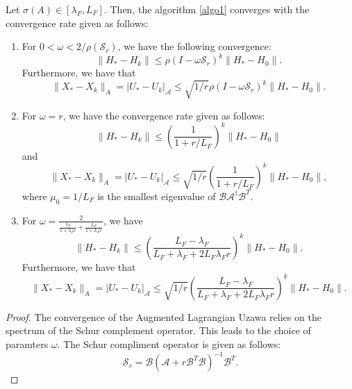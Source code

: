 \begin{itemize}
\begin{theorem}
Let $\sigma(A) \in [\lambda_F, L_F]$. Then, the algorithm \ref{algo1} converges with the convergence rate given as follows:
\begin{enumerate}
\item For $0 < \omega < 2/\rho(\mathcal{S}_r)$, we have the following convergence:
\begin{equation}
\|H_* - H_k\| \leq \rho(I - \omega \mathcal{S}_r)^k \|H_* - H_0\|. 
\end{equation}
Furthermore, we have that 
\begin{equation}
\|X_* - X_k\|_A = |U_* - U_k|_{\mathcal{A}} \leq \sqrt{1/r}\rho(I - \omega \mathcal{S}_r)^k \|H_* - H_0\|. 
\end{equation} 
\item For $\omega = r$, we have the convergence rate given as follows: 
\begin{equation}
\|H_* - H_k\| \leq \left ( \frac{1}{1 + r/L_F}\right )^k \|H_* - H_0\| 
\end{equation} 
and 
\begin{equation}
\|X_* - X_k\|_A = |U_* - U_k|_{\mathcal{A}} \leq \sqrt{1/r} \left ( \frac{1}{1 + r/ L_F}\right )^k \|H_* - H_0\|,  
\end{equation} 
where $\mu_0 = 1/L_F$ is the smallest eigenvalue of $\mathcal{B} \mathcal{A}^{\dag} \mathcal{B}^T$.
\item For $\omega = \frac{2}{ \frac{\lambda_F}{1 + \lambda_F r} + \frac{L_F}{1 + L_F r}}$, we have 
\begin{equation}
\|H_* - H_k\| \leq \left ( \frac{L_F - \lambda_F}{L_F + \lambda_F + 2L_F \lambda_F r} \right )^k \|H_* - H_0\|. 
\end{equation}
Furthermore, we have that 
\begin{equation}
\|X_* - X_k\|_A = |U_* - U_k|_{\mathcal{A}} \leq \sqrt{1/r} \left ( \frac{L_F - \lambda_F}{L_F + \lambda_F + 2L_F \lambda_F r} \right )^k \|H_* - H_0\|. 
\end{equation} 
\end{enumerate} 
\end{theorem} 
\begin{proof}
The convergence of the Augmented Lagrangian Uzawa relies on the spectrum of the Schur complement operator. This leads to the choice of paramters $\omega$. The Schur compliment operator is given as follows: 
\begin{equation}
\mathcal{S}_r = \mathcal{B}( \mathcal{A} + r \mathcal{B}^T \mathcal{B})^{-1} \mathcal{B}^T. 

\end{equation}
\end{proof}
\end{itemize}
